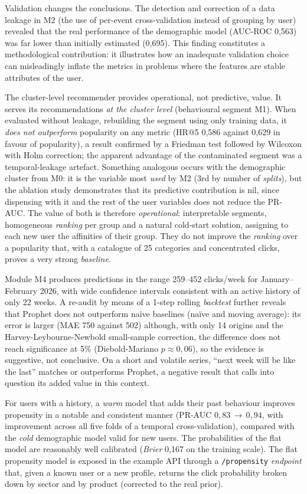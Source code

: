 Validation changes the conclusions. The detection and correction of a data leakage in M2 (the use of per-event cross-validation instead of grouping by user) revealed that the real performance of the demographic model (AUC-ROC 0,563) was far lower than initially estimated (0,695). This finding constitutes a methodological contribution: it illustrates how an inadequate validation choice can misleadingly inflate the metrics in problems where the features are stable attributes of the user.

The cluster-level recommender provides operational, not predictive, value. It serves its recommendations \emph{at the cluster level} (behavioural segment M1). When evaluated without leakage, rebuilding the segment using only training data, it \emph{does not outperform} popularity on any metric (HR@5 0,586 against 0,629 in favour of popularity), a result confirmed by a Friedman test followed by Wilcoxon with Holm correction; the apparent advantage of the contaminated segment was a temporal-leakage artefact. Something analogous occurs with the demographic cluster from M0: it is the variable most \emph{used} by M2 (3rd by number of \textit{splits}), but the ablation study demonstrates that its predictive contribution is nil, since dispensing with it and the rest of the user variables does not reduce the PR-AUC. The value of both is therefore \emph{operational}: interpretable segments, homogeneous \textit{ranking} per group and a natural cold-start solution, assigning to each new user the affinities of their group. They do not improve the \textit{ranking} over a popularity that, with a catalogue of 25 categories and concentrated clicks, proves a very strong \textit{baseline}.

Module M4 produces predictions in the range 259--452 clicks/week for January--February 2026, with wide confidence intervals consistent with an active history of only 22 weeks. A re-audit by means of a 1-step rolling \textit{backtest} further reveals that Prophet does not outperform naïve baselines (naïve and moving average): its error is larger (MAE 750 against 502) although, with only 14 origins and the Harvey-Leybourne-Newbold small-sample correction, the difference does not reach significance at 5\% (Diebold-Mariano $p\approx0{,}06$), so the evidence is suggestive, not conclusive. On a short and volatile series, ``next week will be like the last'' matches or outperforms Prophet, a negative result that calls into question its added value in this context.

For users with a history, a \emph{warm} model that adds their past behaviour improves propensity in a notable and consistent manner (PR-AUC $0{,}83\,\to\,0{,}94$, with improvement across all five folds of a temporal cross-validation), compared with the \emph{cold} demographic model valid for new users. The probabilities of the flat model are reasonably well calibrated (\textit{Brier} 0,167 on the training scale). The flat propensity model is exposed in the example API through a \texttt{/propensity} \textit{endpoint} that, given a known user or a new profile, returns the click probability broken down by sector and by product (corrected to the real prior).

